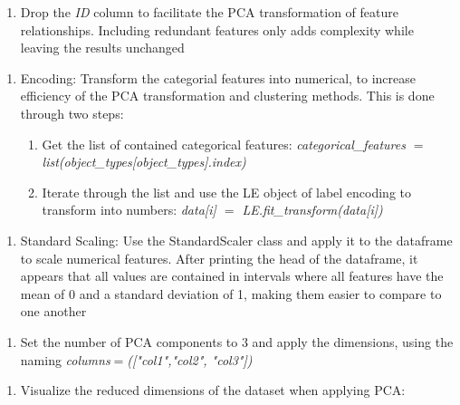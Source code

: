 \documentclass[11pt]{article}
\begin{document}
\vspace{1\baselineskip}
\begin{enumerate}
	\item Drop the \textit{ID} column to facilitate the PCA transformation of feature relationships. Including redundant features only adds complexity while leaving the results unchanged

\end{enumerate}
\vspace{1\baselineskip}
\begin{enumerate}
	\item Encoding: Transform the categorial features into numerical, to increase efficiency of the PCA transformation and clustering methods. This is done through two steps:

\begin{enumerate}
	\item Get the list of contained categorical features: \textit{categorical\_features $=$ list(object\_types[object\_types].index)}

	\item Iterate through the list and use the LE object of label encoding to transform into numbers: \textit{data[i] $=$ LE.fit\_transform(data[i])}

\end{enumerate}
\end{enumerate}
\vspace{1\baselineskip}
\begin{enumerate}
	\item Standard Scaling: Use the StandardScaler class and apply it to the dataframe to scale numerical features. After printing the head of the dataframe, it appears that all values are contained in intervals where all features have the mean of 0 and a standard deviation of 1, making them easier to compare to one another

\end{enumerate}
\vspace{1\baselineskip}
\begin{enumerate}
	\item Set the number of PCA components to 3 and apply the dimensions, using the naming \textit{columns$=$(["col1","col2", "col3"])}

\end{enumerate}
\vspace{1\baselineskip}
\begin{enumerate}
	\item Visualize the reduced dimensions of the dataset when applying PCA:

\end{enumerate}
\end{document}
